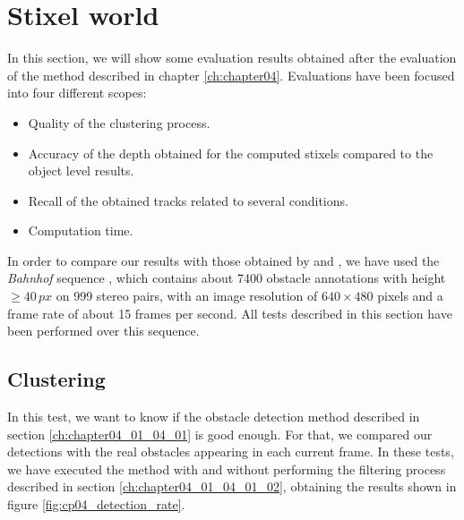 \FloatBarrier

\graphicspath{{./images/chapter04/bmps/}{./images/chapter04/vects/}{./images/chapter04/}}
\section{Stixel world}\label{ch:chapter04_02}

In this section, we will show some evaluation results obtained after the evaluation of the method described in chapter \ref{ch:chapter04}. Evaluations have been focused into four different scopes: 

\begin{itemize}
 \item Quality of the clustering process.
 \item Accuracy of the depth obtained for the computed stixels compared to the object level results.
 \item Recall of the obtained tracks related to several conditions.
 \item Computation time.
\end{itemize}

In order to compare our results with those obtained by \cite{gunyel2012stixels} and \cite{benenson2011stixels}, we have used the \emph{Bahnhof} sequence \citep{ess2009robust}, which contains about 7400 obstacle annotations with height $\geq 40\,px$ on 999 stereo pairs, with an image resolution of $640 \times 480$ pixels and a frame rate of about 15 frames per second. All tests described in this section have been performed over this sequence.

\subsection{Clustering}\label{ch:chapter04_02_01}

In this test, we want to know if the obstacle detection method described in section \ref{ch:chapter04_01_04_01} is good enough. For that, we compared our detections with the real obstacles appearing in each current frame. In these tests, we have executed the method with and without performing the filtering process described in section \ref{ch:chapter04_01_04_01_02}, obtaining the results shown in figure \ref{fig:cp04_detection_rate}.

